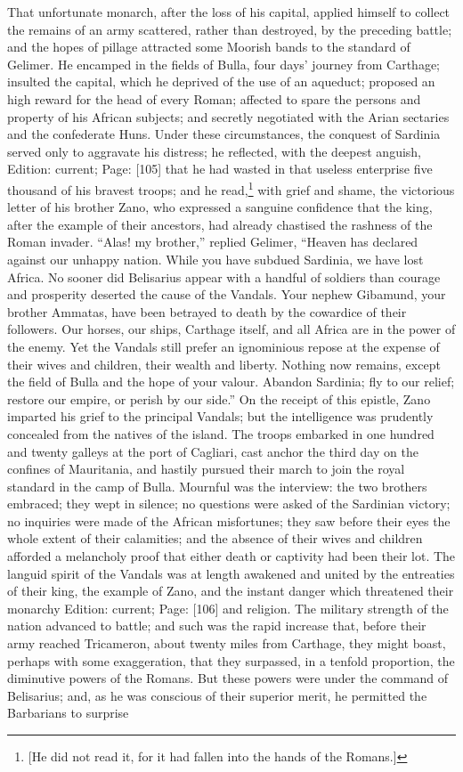 That unfortunate monarch, after the loss of his capital, applied himself to collect the remains of an army scattered, rather than destroyed, by the preceding battle; and the hopes of pillage attracted some Moorish bands to the standard of Gelimer. He encamped in the fields of Bulla, four days\texthebrew{}’ journey from Carthage; insulted the capital, which he deprived of the use of an aqueduct; proposed an high reward for the head of every Roman; affected to spare the persons and property of his African subjects; and secretly negotiated with the Arian sectaries and the confederate Huns. Under these circumstances, the conquest of Sardinia served only to aggravate his distress; he reflected, with the deepest anguish, Edition: current; Page: [105] that he had wasted in that useless enterprise five thousand of his bravest troops; and he read,\footnote{[He did not read it, for it had fallen into the hands of the Romans.]} with grief and shame, the victorious letter of his brother Zano, who expressed a sanguine confidence that the king, after the example of their ancestors, had already chastised the rashness of the Roman invader. \texthebrew{“}Alas! my brother,\texthebrew{}” replied Gelimer, \texthebrew{“}Heaven has declared against our unhappy nation. While you have subdued Sardinia, we have lost Africa. No sooner did Belisarius appear with a handful of soldiers than courage and prosperity deserted the cause of the Vandals. Your nephew Gibamund, your brother Ammatas, have been betrayed to death by the cowardice of their followers. Our horses, our ships, Carthage itself, and all Africa are in the power of the enemy. Yet the Vandals still prefer an ignominious repose at the expense of their wives and children, their wealth and liberty. Nothing now remains, except the field of Bulla and the hope of your valour. Abandon Sardinia; fly to our relief; restore our empire, or perish by our side.\texthebrew{}” On the receipt of this epistle, Zano imparted his grief to the principal Vandals; but the intelligence was prudently concealed from the natives of the island. The troops embarked in one hundred and twenty galleys at the port of Cagliari, cast anchor the third day on the confines of Mauritania, and hastily pursued their march to join the royal standard in the camp of Bulla. Mournful was the interview: the two brothers embraced; they wept in silence; no questions were asked of the Sardinian victory; no inquiries were made of the African misfortunes; they saw before their eyes the whole extent of their calamities; and the absence of their wives and children afforded a melancholy proof that either death or captivity had been their lot. The languid spirit of the Vandals was at length awakened and united by the entreaties of their king, the example of Zano, and the instant danger which threatened their monarchy Edition: current; Page: [106] and religion. The military strength of the nation advanced to battle; and such was the rapid increase that, before their army reached Tricameron, about twenty miles from Carthage, they might boast, perhaps with some exaggeration, that they surpassed, in a tenfold proportion, the diminutive powers of the Romans. But these powers were under the command of Belisarius; and, as he was conscious of their superior merit, he permitted the Barbarians to surprise 
